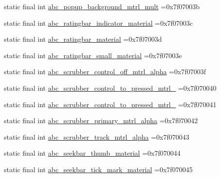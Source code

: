 \begin{DoxyCompactItemize}
\item 
static final int \mbox{\hyperlink{classbr_1_1unb_1_1cic_1_1mp_1_1marketmaster_1_1R_1_1drawable_a1f337500857fbe539e1add84ef4e5806}{abc\+\_\+popup\+\_\+background\+\_\+mtrl\+\_\+mult}} =0x7f07003b
\item 
static final int \mbox{\hyperlink{classbr_1_1unb_1_1cic_1_1mp_1_1marketmaster_1_1R_1_1drawable_aaa9fee670b1d42ac0621478ce9b147d0}{abc\+\_\+ratingbar\+\_\+indicator\+\_\+material}} =0x7f07003c
\item 
static final int \mbox{\hyperlink{classbr_1_1unb_1_1cic_1_1mp_1_1marketmaster_1_1R_1_1drawable_aa4e5eb0aadb05bc536f1ed18546ad7d1}{abc\+\_\+ratingbar\+\_\+material}} =0x7f07003d
\item 
static final int \mbox{\hyperlink{classbr_1_1unb_1_1cic_1_1mp_1_1marketmaster_1_1R_1_1drawable_ab2acd05238c4f39b7ab6c42e4ad26b7a}{abc\+\_\+ratingbar\+\_\+small\+\_\+material}} =0x7f07003e
\item 
static final int \mbox{\hyperlink{classbr_1_1unb_1_1cic_1_1mp_1_1marketmaster_1_1R_1_1drawable_a5bcd27b8c6837f32d456407e6b4a2af8}{abc\+\_\+scrubber\+\_\+control\+\_\+off\+\_\+mtrl\+\_\+alpha}} =0x7f07003f
\item 
static final int \mbox{\hyperlink{classbr_1_1unb_1_1cic_1_1mp_1_1marketmaster_1_1R_1_1drawable_a50515a71252565804534c1a8373cd0ff}{abc\+\_\+scrubber\+\_\+control\+\_\+to\+\_\+pressed\+\_\+mtrl\+\_}} =0x7f070040
\item 
static final int \mbox{\hyperlink{classbr_1_1unb_1_1cic_1_1mp_1_1marketmaster_1_1R_1_1drawable_ae984aab42dc646defd2f096716205472}{abc\+\_\+scrubber\+\_\+control\+\_\+to\+\_\+pressed\+\_\+mtrl\+\_}} =0x7f070041
\item 
static final int \mbox{\hyperlink{classbr_1_1unb_1_1cic_1_1mp_1_1marketmaster_1_1R_1_1drawable_ac23d6d8a83924a219d890c22034cfbd8}{abc\+\_\+scrubber\+\_\+primary\+\_\+mtrl\+\_\+alpha}} =0x7f070042
\item 
static final int \mbox{\hyperlink{classbr_1_1unb_1_1cic_1_1mp_1_1marketmaster_1_1R_1_1drawable_a1985e0636dcef4bd4a87c29f046ba92c}{abc\+\_\+scrubber\+\_\+track\+\_\+mtrl\+\_\+alpha}} =0x7f070043
\item 
static final int \mbox{\hyperlink{classbr_1_1unb_1_1cic_1_1mp_1_1marketmaster_1_1R_1_1drawable_a6de21653b2009eb78f22d4ea78fbac75}{abc\+\_\+seekbar\+\_\+thumb\+\_\+material}} =0x7f070044
\item 
static final int \mbox{\hyperlink{classbr_1_1unb_1_1cic_1_1mp_1_1marketmaster_1_1R_1_1drawable_addabc7726288b710a93fd88a9104ad90}{abc\+\_\+seekbar\+\_\+tick\+\_\+mark\+\_\+material}} =0x7f070045

\end{DoxyCompactItemize}
